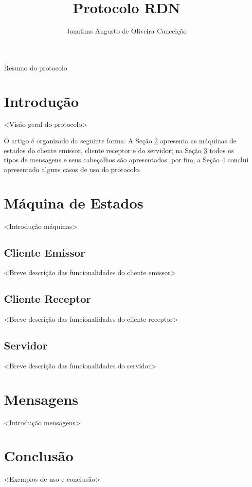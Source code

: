 \documentclass[12pt]{article}
\title{Protocolo RDN}
\author{
  Jonathas Augusto de Oliveira Conceição\inst{1}
}
\begin{document}
\maketitle

\begin{resumo} %
  Resumo do protocolo
\end{resumo}

\section{Introdução}

<Visão geral do protocolo>

O artigo é organizado da seguinte forma:
A Seção \ref{sec:MaquinaDeEstados} apresenta as máquinas de estados do cliente emissor, cliente receptor e do servidor;
na Seção \ref{sec:Mensagens} todos os tipos de mensagens e seus cabeçalhos são apresentados;
por fim, a Seção \ref{sec:Conclusao} conclui apresentado alguns casos de uso do protocolo.

\section{Máquina de Estados}\label{sec:MaquinaDeEstados}
<Introdução máquinas>
\subsection{Cliente Emissor}\label{sec:Emissor}
<Breve descrição das funcionalidades do cliente emissor>
\subsection{Cliente Receptor}\label{sec:Receptor}
<Breve descrição das funcionalidades do cliente receptor>
\subsection{Servidor}\label{sec:Servidor}
<Breve descrição das funcionalidades do servidor>
\section{Mensagens}\label{sec:Mensagens}
<Introdução mensagens>
\section{Conclusão}\label{sec:Conclusao}
<Exemplos de uso e conclusão>
\end{document}
